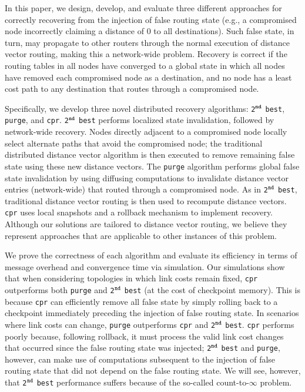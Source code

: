 \documentclass[10pt,conference]{IEEEtran}
\newcommand{\second}{{{\tt 2}$^{{\tt nd}}$ {\tt best} }}
\newcommand{\seconds}{{{\tt 2}$^{{\tt nd}}$ {\tt best}}}
\newcommand{\infinity}{{count-to-$\infty$ }}
\newcommand{\purge}{{{\tt purge} }}
\newcommand{\purges}{{{\tt purge}}}
\newcommand{\cpr}{{\tt cpr} }
\newcommand{\cprs}{{\tt cpr}}
\begin{document}
In this paper, we design, develop, and evaluate three different approaches for correctly recovering from the injection of false routing state (e.g., a compromised node incorrectly
claiming a distance of $0$ to all destinations). Such false state, in turn, may propagate to other routers through the normal execution of distance vector routing, making this
a network-wide problem. Recovery is correct if the routing tables in all nodes have converged to a global state in which all nodes have removed each compromised node as a destination,
and no node has a least cost path to any destination that routes through a compromised node.

Specifically, we develop three novel distributed recovery algorithms: \seconds, \purges, and \cprs. \second performs localized state invalidation, followed by network-wide recovery. 
Nodes directly adjacent to a compromised node locally select alternate paths that avoid the compromised node; the traditional distributed distance vector algorithm is then executed to 
remove remaining false state using these new distance vectors. The \purge algorithm performs global false state invalidation by using diffusing computations to invalidate distance vector 
entries (network-wide) that routed through a compromised node. As in \seconds, traditional distance vector routing is then used to recompute distance vectors. \cpr uses local snapshots 
and a rollback mechanism to implement recovery. Although our solutions are tailored to distance vector routing, we believe they represent approaches that are applicable to other instances
of this problem.

We prove the correctness of each algorithm and evaluate its efficiency in terms of message overhead and convergence time via simulation. Our simulations show that when considering topologies
in which link costs remain fixed, \cpr outperforms both \purge and \second (at the cost of checkpoint memory). This is because \cpr can efficiently remove all false state by simply rolling back
to a checkpoint immediately preceding the injection of false routing state. In scenarios where link costs can change, \purge outperforms \cpr and \seconds. \cpr performs poorly because, following 
rollback, it must process the valid link cost changes that occurred since the false routing state was injected;  \second and \purges, however, can make use of computations subsequent to the 
injection of false routing state that did not depend on the false routing state. We will see, however, that \second performance suffers because of the so-called \infinity problem.
\end{document}
